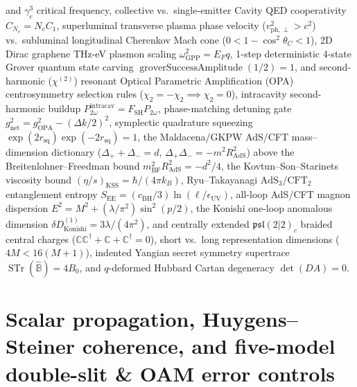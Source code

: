 and $\gamma_e^3$ critical frequency, collective vs.\ single-emitter Cavity QED
cooperativity $C_{N_e}=N_e C_1$, superluminal transverse plasma phase velocity
($v_{\mathrm{ph},\perp}^2>c^2$) vs.\ subluminal longitudinal Cherenkov Mach
cone ($0<1-\cos^2\theta_C<1$), 2D Dirac graphene THz-eV plasmon scaling
$\omega_{\mathrm{GPP}}^2=E_F q$, 1-step deterministic 4-state Grover
quantum state carving $\operatorname{groverSuccessAmplitude}(1/2)=1$, and
second-harmonic ($\chi^{(2)}$) resonant Optical Parametric Amplification (OPA)
centrosymmetry selection rules ($\chi_2=-\chi_2\implies\chi_2=0$), intracavity
second-harmonic buildup $P_{2\omega}^{\mathrm{intracav}}=F_{\mathrm{SH}}P_{2\omega}$,
phase-matching detuning gate $g_{\mathrm{net}}^2=g_{\mathrm{OPA}}^2-(\Delta k/2)^2$,
symplectic quadrature squeezing $\exp(2r_{\mathrm{sq}})\exp(-2r_{\mathrm{sq}})=1$,
the Maldacena/GKPW AdS/CFT mass--dimension dictionary
($\Delta_+ + \Delta_- = d$, $\Delta_+\Delta_- = -m^2 R_{\mathrm{AdS}}^2$)
above the Breitenlohner--Freedman bound $m_{\mathrm{BF}}^2 R_{\mathrm{AdS}}^2 = -d^2/4$,
the Kovtun--Son--Starinets viscosity bound $(\eta/s)_{\mathrm{KSS}}=\hbar/(4\pi k_B)$,
Ryu--Takayanagi $\text{AdS}_3/\text{CFT}_2$ entanglement entropy
$S_{\mathrm{EE}}=(c_{\mathrm{BH}}/3)\ln(\ell/\epsilon_{\mathrm{UV}})$,
all-loop AdS/CFT magnon dispersion $E^2=M^2+(\lambda/\pi^2)\sin^2(p/2)$,
the Konishi one-loop anomalous dimension $\delta D_{\mathrm{Konishi}}^{(1)}=3\lambda/(4\pi^2)$,
and centrally extended $\mathfrak{psl}(2|2)_c$ braided central charges
($\mathbb C\mathbb C^\dagger+\mathbb C+\mathbb C^\dagger=0$), short vs.\ long
representation dimensions ($4M < 16(M+1)$), indented Yangian secret symmetry
supertrace $\operatorname{STr}(\widehat{\mathbb B})=4B_0$, and $q$-deformed
Hubbard Cartan degeneracy $\det(DA)=0$.


\section{Scalar propagation, Huygens--Steiner coherence, and five-model double-slit \& OAM error controls}

